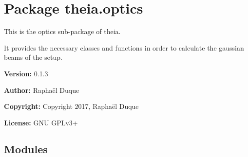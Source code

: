 %
%
%


\section{Package theia.optics}

    \label{theia:optics}
This is the optics sub-package of theia.

It provides the necessary classes and functions in order to calculate the 
gaussian beams of the setup.

\textbf{Version:} 0.1.3



\textbf{Author:} Raphaël Duque



\textbf{Copyright:} Copyright 2017, Raphaël Duque



\textbf{License:} GNU GPLv3+





\subsection{Modules}

